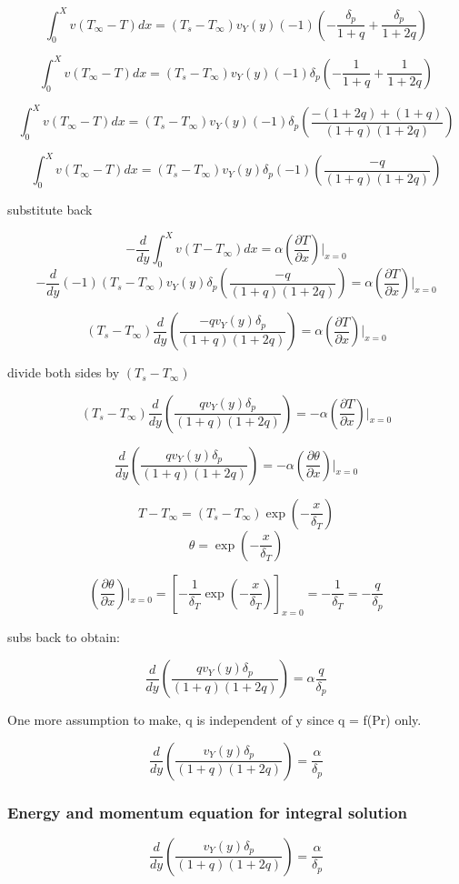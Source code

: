 \documentclass[11pt]{article}
\begin{document}
$$\int_0^X v (T_\infty - T) dx  =(T_s -T_\infty)v_Y (y) (-1) ( -\frac{ \delta_p}{1 + q} +\frac{  \delta_p}{1+2q} )$$

$$\int_0^X v (T_\infty - T) dx  =(T_s -T_\infty)v_Y (y) (-1) \delta_p ( -\frac{1 }{1 + q} +\frac{ 1}{1+2q} )$$

$$\int_0^X v (T_\infty - T) dx  =(T_s -T_\infty)v_Y (y) (-1) \delta_p ( \frac{-(1+2q)+(1+q) }{(1 + q)(1+2q)}  )$$


$$\int_0^X v (T_\infty - T) dx  =(T_s -T_\infty)v_Y (y) \delta_p (-1) ( \frac{-q}{(1 + q)(1+2q)}  )$$

substitute back


$$-\frac{d}{dy} \int_0^X v (T- T_\infty ) dx = \alpha (\frac{\partial T}{\partial x})|_{x=0}$$
$$-\frac{d}{dy} (-1) (T_s -T_\infty)v_Y (y) \delta_p ( \frac{-q}{(1 + q)(1+2q)}  ) = \alpha (\frac{\partial T}{\partial x})|_{x=0}$$

$$(T_s -T_\infty) \frac{d}{dy}  ( \frac{-q v_Y (y) \delta_p}{(1 + q)(1+2q)}  ) = \alpha (\frac{\partial T}{\partial x})|_{x=0}$$

divide both sides by $(T_s -T_\infty)$

$$(T_s -T_\infty) \frac{d}{dy}  ( \frac{q v_Y (y) \delta_p}{(1 + q)(1+2q)}  ) = -\alpha (\frac{\partial T}{\partial x})|_{x=0}$$

$$ \frac{d}{dy}  ( \frac{q v_Y (y) \delta_p}{(1 + q)(1+2q)}  ) = -\alpha (\frac{\partial \theta}{\partial x})|_{x=0}$$


$$T-T_\infty = (T_s -T_\infty) \exp (-\frac{x}{\delta_T})$$
$$\theta =  \exp (-\frac{x}{\delta_T})$$

$$(\frac{\partial \theta}{\partial x})|_{x=0} = [- \frac{1}{\delta_T} \exp (-\frac{x}{\delta_T})]_{x=0}=- \frac{1}{\delta_T} = - \frac{q}{\delta_p}$$

subs back to obtain:

$$ \frac{d}{dy}  ( \frac{q v_Y (y) \delta_p}{(1 + q)(1+2q)}  ) = \alpha \frac{q}{\delta_p}$$

One more assumption to make, q is independent of y since q = f(Pr) only.

$$ \frac{d}{dy}  ( \frac{ v_Y (y) \delta_p}{(1 + q)(1+2q)}  ) =  \frac{\alpha}{\delta_p}$$

\subsubsection{Energy and momentum equation for integral solution}


$$ \frac{d}{dy}  ( \frac{ v_Y (y) \delta_p}{(1 + q)(1+2q)}  ) =  \frac{\alpha}{\delta_p}$$
\end{document}
